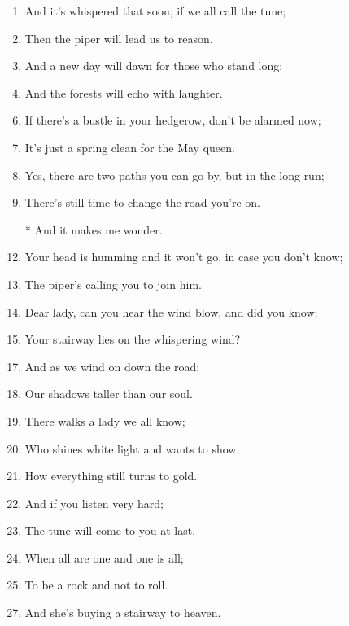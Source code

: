 \documentclass{article}
\begin{document}
\begin{center}
\begin{enumerate}
                \item And it's whispered that soon, if we all call the tune;
                \item Then the piper will lead us to reason.
                \item And a new day will dawn for those who stand long;
                \item And the forests will echo with laughter.

                \item[]

                \item If there's a bustle in your hedgerow, don't be alarmed now;
                \item It's just a spring clean for the May queen.
                \item Yes, there are two paths you can go by, but in the long run;
                \item There's still time to change the road you're on.

                \item[]
                \item[*] And it makes me wonder.
                \pagebreak

                \item Your head is humming and it won't go, in case you don't know;
                \item The piper's calling you to join him.
                \item Dear lady, can you hear the wind blow, and did you know;
                \item Your stairway lies on the whispering wind?

                \item[]

                \item And as we wind on down the road;
                \item Our shadows taller than our soul.
                \item There walks a lady we all know;
                \item Who shines white light and wants to show;
                \item How everything still turns to gold.
                \item And if you listen very hard;
                \item The tune will come to you at last.
                \item When all are one and one is all;
                \item To be a rock and not to roll.

                \item[]

                \item And she's buying a stairway to heaven.

            \end{enumerate}
    \end{center}
\end{document}
